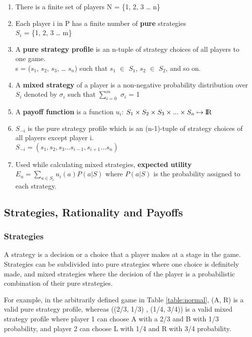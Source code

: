 \documentclass[11pt]{article}
\theoremstyle{definition}
\begin{document}
\begin{enumerate}
\item There is a finite set of players N = \{1, 2, 3 … n\}
\item Each player i in P has a finite number of \textbf{pure} strategies \\$S_i$ = \{1, 2, 3 … m\}
\item A \textbf{pure strategy profile} is an n-tuple of strategy choices of all players to one game. \\
s = ($s_1$, $s_2$, $s_3$, … $s_n$) such that $s_1$ $\in$ $S_1$, $s_2$ $\in$ $S_2$, and so on.
\item A \textbf{mixed strategy} of a player is a non-negative probability distribution over $S_i$ denoted by $\sigma_i$ such that $\sum\limits_{i = 0}^{m}$ $\sigma_i$ = 1
\item A \textbf{payoff function} is a function $u_i$: $S_1 \times S_2 \times S_3 \times ... \times S_n \mapsto {\rm I\!R}$
\item $S_{-i}$ is the pure strategy profile which is an (n-1)-tuple of strategy choices of all players except player i.\\
$S_{-i} = (s_1, s_2, s_3 ... s_{i-1}, s_{i+1} ... s_n)$
\item Used while calculating mixed strategies, \textbf{expected utility} $E_u = \sum\limits_{a \in S_i} u_i(a)P(a|S)$ where $P(a|S)$ is the probability assigned to each strategy.
\end{enumerate}

\subsection{Strategies, Rationality and Payoffs}

\subsubsection{Strategies}
A strategy is a decision or a choice that a player makes at a stage in the game. Strategies can be subdivided into pure strategies where one choice is definitely made, and mixed strategies where the decision of the player is a probabilistic combination of their pure strategies.

 For example, in the arbitrarily defined game in Table \ref{table:normal}, (A, R) is a valid pure strategy profile, whereas ((2/3, 1/3) , (1/4, 3/4)) is a valid mixed strategy profile where player 1 can choose A with a 2/3 and B with 1/3 probability, and player 2 can choose L with 1/4 and R with 3/4 probability.
\end{document}
